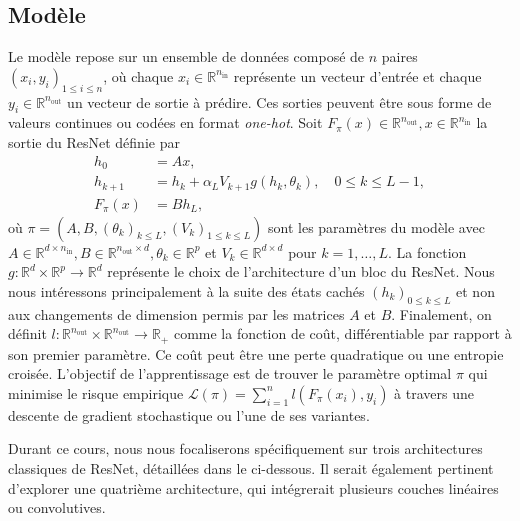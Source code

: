 \subsection*{Modèle}
Le modèle repose sur un ensemble de données composé de $n$ paires $(x_i, y_i)_{1 \leqslant i \leqslant n}$, où chaque $x_i \in \mathbb{R}^{n_{\text{in}}}$ représente un vecteur d'entrée et chaque $y_i \in \mathbb{R}^{n_{\text{out}}}$ un vecteur de sortie à prédire. Ces sorties peuvent être sous forme de valeurs continues ou codées en format \textit{one-hot}. Soit $F_\pi(x) \in \mathbb{R}^{n_{\text{out}}}, x \in \mathbb{R}^{n_{\text{in}}}$ la sortie du ResNet définie par 
\begin{align}\label{resnet_equation}
    h_0 &= Ax, \nonumber\\
    h_{k+1} &= h_k + \alpha_L V_{k+1}g(h_k, \theta_k), \quad 0 \leqslant k \leqslant L - 1, \\
    F_{\pi}(x) &= Bh_L, \nonumber
\end{align}
où $\pi = (A, B, (\theta_k)_{k \leqslant L}, (V_k)_{1 \leqslant k \leqslant L})$ sont les paramètres du modèle avec $A \in \mathbb{R}^{d \times n_{\text{in}}}, B \in \mathbb{R}^{n_{\text{out}} \times d}, \theta_k \in \mathbb{R}^p$ et $V_k \in \mathbb{R}^{d \times d}$ pour $k = 1, \ldots, L$. La fonction $g : \mathbb{R}^d \times \mathbb{R}^p \to \mathbb{R}^d$ représente le choix de l'architecture d'un bloc du ResNet. Nous nous intéressons principalement à la suite des états cachés $(h_k)_{0 \leqslant k \leqslant L}$ et non aux changements de dimension permis par les matrices $A$ et $B$.
Finalement, on définit $l: \mathbb{R}^{n_{\text{out}}} \times \mathbb{R}^{n_{\text{out}}} \to \mathbb{R}_+$ comme la fonction de coût, différentiable par rapport à son premier paramètre. Ce coût peut être une perte quadratique ou une entropie croisée. L'objectif de l'apprentissage est de trouver le paramètre optimal $\pi$ qui minimise le risque empirique $\mathscr{L}(\pi) = \sum_{i=1}^{n} l(F_\pi(x_i), y_i)$ à travers une descente de gradient stochastique ou l'une de ses variantes.

Durant ce cours, nous nous focaliserons spécifiquement sur trois architectures classiques de ResNet, détaillées dans le  ci-dessous. Il serait également pertinent d'explorer une quatrième architecture, qui intégrerait plusieurs couches linéaires ou convolutives.

